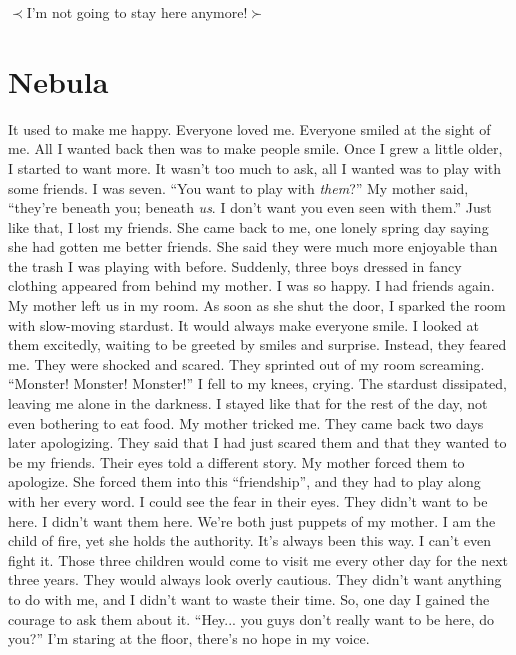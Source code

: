 \documentclass[openany, 12pt]{book}
\newcommand\tab[1][1cm]{\hspace*{#1}}
\begin{document}
\newline
$\prec$I'm not going to stay here anymore!$\succ$
\chapter{Nebula}
\tab
It used to make me happy. Everyone loved me. Everyone smiled at the sight of me. All I wanted back then was to make people smile. Once I grew a little older, I started to want more. It wasn’t too much to ask, all I wanted was to play with some friends. I was seven. ``You want to play with \textit{them}?'' My mother said, ``they’re beneath you; beneath \textit{us}. I don’t want you even seen with them.'' Just like that, I lost my friends.
\newline
\tab
She came back to me, one lonely spring day saying she had gotten me better friends. She said they were much more enjoyable than the trash I was playing with before. Suddenly, three boys dressed in fancy clothing appeared from behind my mother. I was so happy. I had friends again. My mother left us in my room. As soon as she shut the door, I sparked the room with slow-moving stardust. It would always make everyone smile. I looked at them excitedly, waiting to be greeted by smiles and surprise. Instead, they feared me. They were shocked and scared. They sprinted out of my room screaming. ``Monster! Monster! Monster!'' I fell to my knees, crying. The stardust dissipated, leaving me alone in the darkness. I stayed like that for the rest of the day, not even bothering to eat food. My mother tricked me.
\newline
\tab
They came back two days later apologizing. They said that I had just scared them and that they wanted to be my friends. Their eyes told a different story. My mother forced them to apologize. She forced them into this ``friendship'', and they had to play along with her every word. I could see the fear in their eyes. They didn’t want to be here. I didn’t want them here. We’re both just puppets of my mother. I am the child of fire, yet she holds the authority. It’s always been this way. I can’t even fight it.
\newline
\tab
Those three children would come to visit me every other day for the next three years. They would always look overly cautious. They didn’t want anything to do with me, and I didn’t want to waste their time. So, one day I gained the courage to ask them about it. ``Hey... you guys don’t really want to be here, do you?'' I’m staring at the floor, there’s no hope in my voice.
\newline
\end{document}
